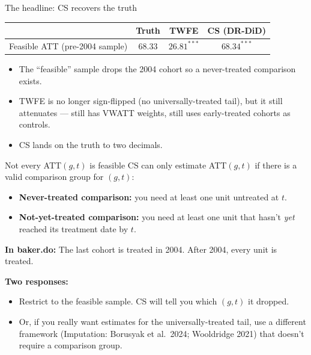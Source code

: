 \documentclass[aspectratio=169,11pt]{beamer}
\begin{document}
\begin{frame}{The headline: CS recovers the truth}
\vspace{0.8em}
\begin{center}\large
\begin{tabular}{lccc}
\toprule
& \textbf{Truth} & \textbf{TWFE} & \textbf{CS (DR-DiD)} \\
\midrule
Feasible ATT (pre-2004 sample) & $68.33$ & $26.81^{\ast\ast\ast}$ & $\mathbf{68.34}^{\ast\ast\ast}$ \\
\bottomrule
\end{tabular}
\end{center}

\vspace{0.8em}
\begin{itemize}\small
  \item The ``feasible'' sample drops the 2004 cohort so a never-treated comparison exists.
  \item TWFE is no longer sign-flipped (no universally-treated tail), but it still attenuates --- still has VWATT weights, still uses early-treated cohorts as controls.
  \item CS lands on the truth to two decimals.
\end{itemize}
\end{frame}

\begin{frame}{Not every ATT$(g,t)$ is feasible}
\vspace{0.5em}
CS can only estimate ATT$(g,t)$ if there is a valid comparison group for $(g, t)$:

\vspace{0.5em}
\begin{itemize}\small
  \item \textbf{Never-treated comparison:} you need at least one unit untreated at $t$.
  \item \textbf{Not-yet-treated comparison:} you need at least one unit that hasn't \textit{yet} reached its treatment date by $t$.
\end{itemize}

\vspace{0.6em}
\textbf{In baker.do:} \;The last cohort is treated in 2004. \;After 2004, every unit is treated. \;

\vspace{0.6em}
\textbf{Two responses:}
\begin{itemize}\small
  \item Restrict to the feasible sample. \;CS will tell you which $(g,t)$ it dropped.
  \item Or, if you really want estimates for the universally-treated tail, use a different framework (Imputation: Borusyak et al.\ 2024; Wooldridge 2021) that doesn't require a comparison group.
\end{itemize}
\end{frame}
\end{document}
